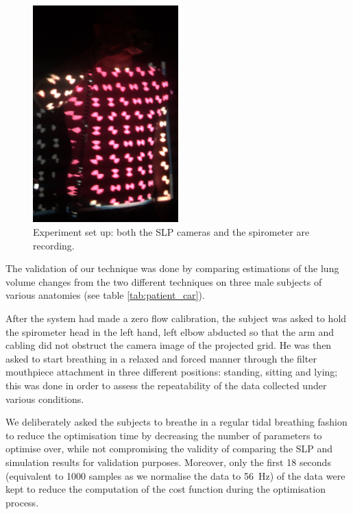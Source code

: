 \begin{figure}
	\centering
	 \includegraphics[width=0.5\textwidth]{pics/tobi_resized}
	\caption[Experiment set up]{\label{fig:tobi_resized}Experiment set up: both the SLP cameras and the spirometer are recording.}
\end{figure}

The validation of our technique was done by comparing estimations of the lung volume changes from the two different techniques on three male subjects of various anatomies (see table \ref{tab:patient_car}). 

After the system had made a zero flow calibration, the subject was asked to hold the spirometer head in the left hand, left elbow abducted so that the arm and cabling did not obstruct the camera image of the projected grid. He was then asked to start breathing in a relaxed and forced manner through the filter mouthpiece attachment in three different positions: standing, sitting and lying; this was done in order to assess the repeatability of the data collected under various conditions.

We deliberately asked the subjects to breathe in a regular tidal breathing fashion to reduce the optimisation time by decreasing the number of parameters to optimise over, while not compromising the validity of comparing the SLP and simulation results for validation purposes. Moreover, only the first 18 seconds (equivalent to 1000 samples as we normalise the data to 56~Hz) of the data were kept to reduce the computation of the cost function during the optimisation process.

